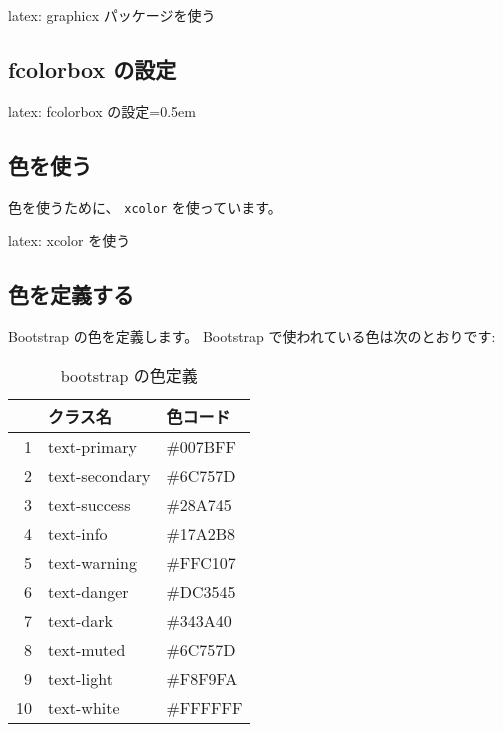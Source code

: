 \documentclass[dvipdfmx,a4j,14pt,uplatex,openany]{jsbook}
\begin{document}
\begin{programlist}[label={org7dd5133}]{latex}{: graphicx パッケージを使う}\usepackage{graphicx}
\end{programlist}

\subsection{fcolorbox の設定}
\label{sec:org9de61e1}
\begin{programlist}[label={orgb1a2d9e}]{latex}{: fcolorbox の設定}\fboxsep=0.5em
\fboxrule=0pt
\end{programlist}

\subsection{色を使う}
\label{sec:orgc1e728a}
色を使うために、 \texttt{xcolor} を使っています。

\begin{programlist}[label={org3b48ab2}]{latex}{: xcolor を使う}\usepackage[usenames,divpsnames,svgnames,table,hyperref]{xcolor}
\end{programlist}

\subsection{色を定義する}
\label{sec:orga1a72c7}
Bootstrap の色を定義します。
Bootstrap で使われている色は次のとおりです:

\begin{table}[htbp]
\caption{\label{tab:org2a6dd70}
bootstrap の色定義}
\centering
\begin{tabular}{rll}
\hline
 & クラス名 & 色コード\\
\hline
1 & text-primary & \#007BFF\\
2 & text-secondary & \#6C757D\\
3 & text-success & \#28A745\\
4 & text-info & \#17A2B8\\
5 & text-warning & \#FFC107\\
6 & text-danger & \#DC3545\\
7 & text-dark & \#343A40\\
8 & text-muted & \#6C757D\\
9 & text-light & \#F8F9FA\\
10 & text-white & \#FFFFFF\\
\hline
\end{tabular}
\end{table}
\end{document}
